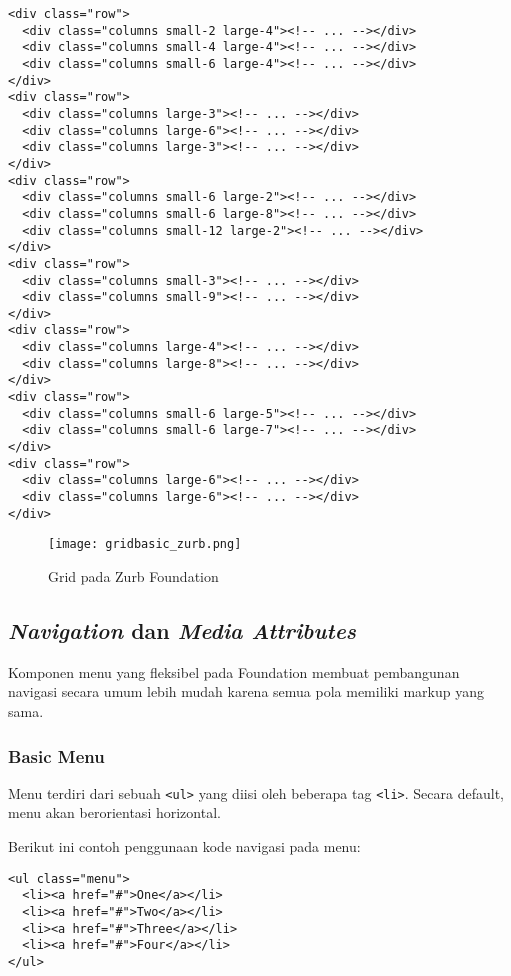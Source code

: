 \begin{lstlisting}[frame=single] 
<div class="row">
  <div class="columns small-2 large-4"><!-- ... --></div>
  <div class="columns small-4 large-4"><!-- ... --></div>
  <div class="columns small-6 large-4"><!-- ... --></div>
</div>
<div class="row">
  <div class="columns large-3"><!-- ... --></div>
  <div class="columns large-6"><!-- ... --></div>
  <div class="columns large-3"><!-- ... --></div>
</div>
<div class="row">
  <div class="columns small-6 large-2"><!-- ... --></div>
  <div class="columns small-6 large-8"><!-- ... --></div>
  <div class="columns small-12 large-2"><!-- ... --></div>
</div>
<div class="row">
  <div class="columns small-3"><!-- ... --></div>
  <div class="columns small-9"><!-- ... --></div>
</div>
<div class="row">
  <div class="columns large-4"><!-- ... --></div>
  <div class="columns large-8"><!-- ... --></div>
</div>
<div class="row">
  <div class="columns small-6 large-5"><!-- ... --></div>
  <div class="columns small-6 large-7"><!-- ... --></div>
</div>
<div class="row">
  <div class="columns large-6"><!-- ... --></div>
  <div class="columns large-6"><!-- ... --></div>
</div>
\end{lstlisting}

\begin{figure} [H]
	\centering  
	\texttt{[image: gridbasic\_zurb.png]}  
	\caption{Grid pada Zurb Foundation}	 
\end{figure}

\subsection{\textit{Navigation} dan \textit{Media Attributes}}
Komponen menu yang fleksibel pada Foundation membuat pembangunan navigasi secara umum lebih mudah karena semua pola memiliki markup yang sama.

\subsubsection{Basic Menu}

Menu terdiri dari sebuah \texttt{<ul>} yang diisi oleh beberapa tag \texttt{<li>}. Secara default, menu akan berorientasi horizontal.

Berikut ini contoh penggunaan kode navigasi pada menu:

\begin{lstlisting}[frame=single] 
<ul class="menu">
  <li><a href="#">One</a></li>
  <li><a href="#">Two</a></li>
  <li><a href="#">Three</a></li>
  <li><a href="#">Four</a></li>
</ul>
\end{lstlisting}

